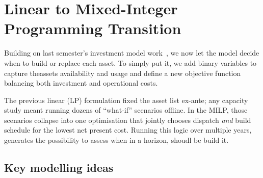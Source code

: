 \newpage
\section{Linear to Mixed-Integer Programming Transition}
\label{sec:MILP_transition}
Building on last semester's investment model work~\cite{vierui2024vt1}, we now let the
model decide when to build or replace each asset.  To simply put it, we add binary variables 
to capture theassets availability and usage and define a new objective function 
balancing both investment and operational costs.

The previous linear (LP) formulation fixed the asset list ex-ante; any capacity
study meant running dozens of “what-if” scenarios offline.  In the MILP,
those scenarios collapse into one optimisation that jointly chooses
dispatch \emph{and} build schedule for the lowest net present cost. Running this logic over
multiple years, generates the possibility to assess when in a horizon, shoudl be build it.

\subsection{Key modelling ideas}
\label{ssec:MILP_methodology}

